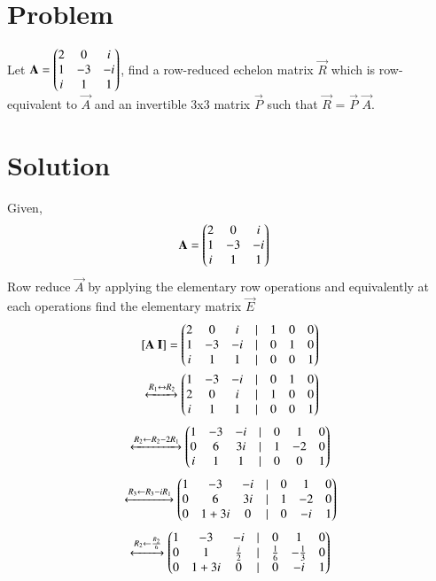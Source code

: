 \documentclass[journal,12pt,twocolumn]{IEEEtran}
\begin{document}
\section{Problem}
Let $\mathbf{A}= \begin{pmatrix}2 & 0 & i \\ 1 & -3 & -i \\ i & 1 &  1\end{pmatrix}$, find a row-reduced echelon matrix $\vec{R}$ which is row-equivalent to $\vec{A}$ and an invertible 3x3 matrix $\vec{P}$ such that $\vec{R}$ = $\vec{P}$ $\vec{A}$.
\section{Solution}
Given,
\begin{align}
&\mathbf{A}=\begin{pmatrix}2 & 0 & i \\ 1 & -3 & -i \\ i & 1 &  1\end{pmatrix}
\end{align}
Row reduce $\vec{A}$ by applying the elementary row operations and equivalently at each operations find the elementary matrix $\vec{E}$
\begin{align}
	\mathbf{[A \ I]} = \begin{pmatrix} 2 & 0 & i &| & 1 & 0 & 0\\
				1 & -3 & -i &| & 0 & 1 & 0 \\
				i & 1 & 1 &| & 0 & 0 & 1\end{pmatrix}\\
			\xleftrightarrow[]{R_1 \leftrightarrow R_2}
			\begin{pmatrix} 1 & -3 & -i& | & 0& 1 & 0\\
                                2 & 0 & i &| & 1 & 0 &0\\
                                i & 1 & 1 &| & 0 & 0 & 1\end{pmatrix}
\end{align}
\begin{align}
			\xleftrightarrow[]{R_2 \leftarrow R_2 - 2R_1}
                        \begin{pmatrix} 1 & -3 & -i &| & 0 & 1 & 0 \\
                                0 & 6 & 3i &| & 1 & -2 & 0 \\
                                i & 1 & 1 &| & 0 & 0 & 1\end{pmatrix}
\end{align}
\begin{align}
			\xleftrightarrow[]{R_3 \leftarrow R_3 - iR_1}
                        \begin{pmatrix} 1 & -3 & -i &| & 0 & 1 & 0 \\
                                0 & 6 & 3i &| & 1 & -2 &0\\
                                0 & 1+3i & 0 &| & 0 & -i & 1\end{pmatrix}
\end{align}
\begin{align}
\xleftrightarrow[]{R_2 \leftarrow \frac{R_2}{6}}
                \begin{pmatrix} 1 & -3 & -i &| & 0 & 1 & 0 \\
			0 & 1 & \frac{i}{2}&| & \frac{1}{6} & -\frac{1}{3} & 0 \\
			0 & 1+3i & 0 &| & 0 & -i & 1\end{pmatrix}
\end{align}
\end{document}
